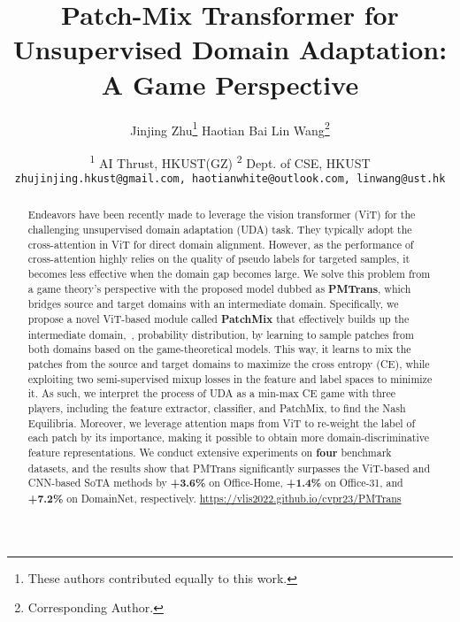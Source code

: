 \documentclass[10pt,twocolumn,letterpaper, ]{article}
\newcommand*{\affmark}[1][*]{\textsuperscript{#1}}
\begin{document}
\title{Patch-Mix Transformer for Unsupervised Domain Adaptation: A Game Perspective}

\author{Jinjing Zhu\thanks{These authors contributed equally to this work. }
\quad
Haotian Bai\footnotemark[1]
\quad
Lin Wang\thanks{Corresponding Author.}
\and
\affmark[1] AI Thrust, HKUST(GZ)\quad
\affmark[2] Dept. of CSE, HKUST\\
\quad
{\tt\small zhujinjing.hkust@gmail.com, haotianwhite@outlook.com, linwang@ust.hk}
}

\maketitle
\begin{abstract}
\vspace{-10pt}
Endeavors have been recently made to leverage the vision transformer (ViT) for the challenging unsupervised domain adaptation (UDA) task. They typically adopt the cross-attention in ViT for direct domain alignment. 
However, as the performance of cross-attention highly relies on the quality of pseudo labels for targeted samples, it becomes less effective when the domain gap becomes large. 
We solve this problem from a game theory's perspective with the proposed model dubbed as \textbf{PMTrans}, which bridges source and target domains with an intermediate domain. 
Specifically, we propose a novel ViT-based module called \textbf{PatchMix} that effectively builds up the intermediate domain,~\ie, probability distribution, by learning to sample patches from both domains based on the game-theoretical models.
This way, it learns to mix the patches from the source and target domains to maximize the cross entropy (CE), while exploiting two semi-supervised mixup losses in the feature and label spaces to minimize it.
As such, we interpret the process of UDA as a min-max CE game with three players, including the feature extractor, classifier, and PatchMix, to find the Nash Equilibria. 
Moreover, we leverage attention maps from ViT to re-weight the label of each patch by its importance, making it possible to obtain more domain-discriminative feature representations. We conduct extensive experiments on \textbf{four} benchmark datasets, and the results show that PMTrans significantly surpasses the ViT-based and CNN-based SoTA methods by \textbf{+3.6\%} on Office-Home, \textbf{+1.4\%} on Office-31, and \textbf{+7.2\%} on DomainNet, respectively. \url{https://vlis2022.github.io/cvpr23/PMTrans}
\end{abstract}
\vspace{-18pt}
\end{document}
